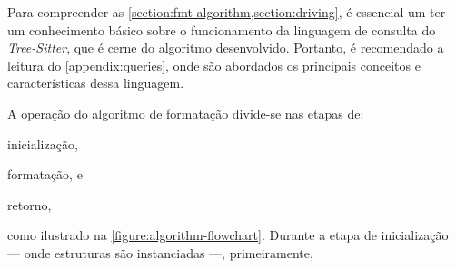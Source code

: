 \documentclass
  [11pt,a4paper,english,brazil,openright,sumario=tradicional,twoside]
  {abntex2}
\newcommand{\treesitter}{\textit{Tree-Sitter}\xspace}
\begin{document}
  Para compreender as \cref{section:fmt-algorithm,section:driving}, é essencial
  um ter um conhecimento básico sobre o funcionamento da linguagem de consulta
  do \treesitter, que é cerne do algoritmo desenvolvido. Portanto, é
  recomendado a leitura do \cref{appendix:queries}, onde são abordados os
  principais conceitos e características dessa linguagem.

  A operação do algoritmo de formatação divide-se nas etapas de:
  \begin{inparaenum}
    \item inicialização,
    \item formatação, e
    \item retorno,
  \end{inparaenum}
  como ilustrado na \cref{figure:algorithm-flowchart}. Durante a etapa de
  inicialização --- onde estruturas são instanciadas ---, primeiramente,
\end{document}
